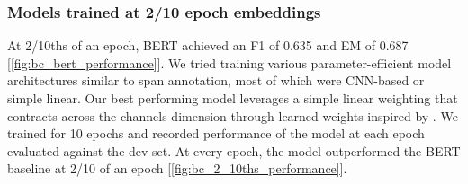 
\subsubsection{Models trained at 2/10 epoch embeddings}

At 2/10ths of an epoch, BERT achieved an F1 of 0.635 and EM of 0.687 [\ref{fig:bc_bert_performance}]. We tried training various parameter-efficient model architectures similar to span annotation, most of which were CNN-based or simple linear. Our best performing model leverages a simple linear weighting that contracts across the channels dimension through learned weights inspired by \cite{tenney-etal-2019-bert}. We trained for 10 epochs and recorded performance of the model at each epoch evaluated against the dev set. At every epoch, the model outperformed the BERT baseline at 2/10 of an epoch [\ref{fig:bc_2_10ths_performance}].

